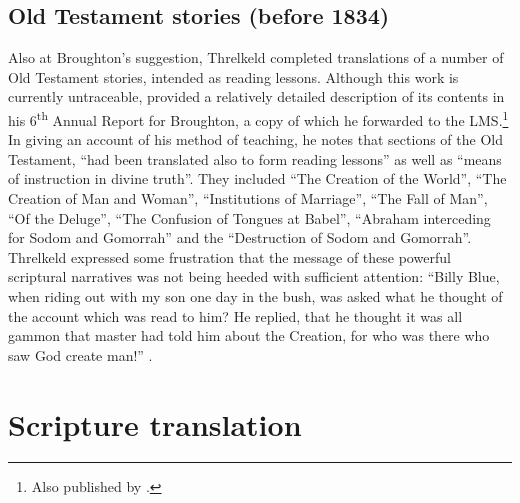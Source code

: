 {\subsection{Old Testament stories (before 1834)}

Also at Broughton’s suggestion, Threlkeld completed translations of a number of Old Testament stories, intended as reading lessons. Although this work is currently untraceable, \citet{threlkeld_annual_1836} provided a relatively detailed description of its contents in his 6\textsuperscript{th} Annual Report for Broughton, a copy of which he forwarded to the LMS.\footnote{Also published by \citet[115]{gunson_australian_1974a}.} In giving an account of his method of teaching, he notes that sections of the Old Testament, “had been translated also to form reading lessons” as well as “means of instruction in divine truth”. They included “The Creation of the World”, “The Creation of Man and Woman”, “Institutions of Marriage”, “The Fall of Man”, “Of the Deluge”, “The Confusion of Tongues at Babel”, “Abraham interceding for Sodom and Gomorrah” and the “Destruction of Sodom and Gomorrah”. Threlkeld expressed some frustration that the message of these powerful scriptural narratives was not being heeded with sufficient attention: “Billy Blue, when riding out with my son one day in the bush, was asked what he thought of the account which was read to him? He replied, that he thought it was all gammon that master had told him about the Creation, for who was there who saw God create man!” \citep[134]{gunson_australian_1974a}.

\section{Scripture translation}

}
